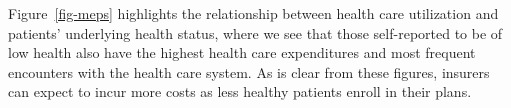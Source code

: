 \documentclass[
  letterpaper,
  DIV=11,
  numbers=noendperiod]{scrreport}
\theoremstyle{definition}
\theoremstyle{remark}
\begin{document}
Figure~\ref{fig-meps} highlights the relationship between health care
utilization and patients' underlying health status, where we see that
those self-reported to be of low health also have the highest health
care expenditures and most frequent encounters with the health care
system. As is clear from these figures, insurers can expect to incur
more costs as less healthy patients enroll in their plans.

\begin{figure}

\begin{minipage}[t]{0.50\linewidth}

{\centering 


}

\end{minipage}%
%
\begin{minipage}[t]{0.50\linewidth}

{\centering 

\raisebox{-\height}{

}}
\end{minipage}
\end{figure}
\end{document}
